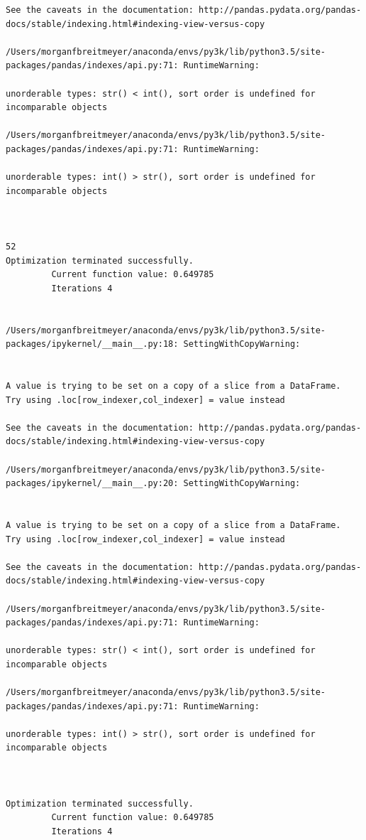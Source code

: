 \begin{lstlisting}
See the caveats in the documentation: http://pandas.pydata.org/pandas-docs/stable/indexing.html#indexing-view-versus-copy

/Users/morganfbreitmeyer/anaconda/envs/py3k/lib/python3.5/site-packages/pandas/indexes/api.py:71: RuntimeWarning:

unorderable types: str() < int(), sort order is undefined for incomparable objects

/Users/morganfbreitmeyer/anaconda/envs/py3k/lib/python3.5/site-packages/pandas/indexes/api.py:71: RuntimeWarning:

unorderable types: int() > str(), sort order is undefined for incomparable objects



52
Optimization terminated successfully.
         Current function value: 0.649785
         Iterations 4


/Users/morganfbreitmeyer/anaconda/envs/py3k/lib/python3.5/site-packages/ipykernel/__main__.py:18: SettingWithCopyWarning:


A value is trying to be set on a copy of a slice from a DataFrame.
Try using .loc[row_indexer,col_indexer] = value instead

See the caveats in the documentation: http://pandas.pydata.org/pandas-docs/stable/indexing.html#indexing-view-versus-copy

/Users/morganfbreitmeyer/anaconda/envs/py3k/lib/python3.5/site-packages/ipykernel/__main__.py:20: SettingWithCopyWarning:


A value is trying to be set on a copy of a slice from a DataFrame.
Try using .loc[row_indexer,col_indexer] = value instead

See the caveats in the documentation: http://pandas.pydata.org/pandas-docs/stable/indexing.html#indexing-view-versus-copy

/Users/morganfbreitmeyer/anaconda/envs/py3k/lib/python3.5/site-packages/pandas/indexes/api.py:71: RuntimeWarning:

unorderable types: str() < int(), sort order is undefined for incomparable objects

/Users/morganfbreitmeyer/anaconda/envs/py3k/lib/python3.5/site-packages/pandas/indexes/api.py:71: RuntimeWarning:

unorderable types: int() > str(), sort order is undefined for incomparable objects



Optimization terminated successfully.
         Current function value: 0.649785
         Iterations 4



\end{lstlisting}
